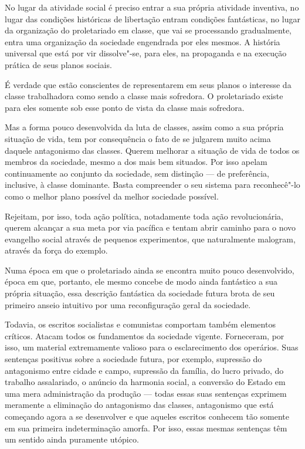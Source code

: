 No lugar da atividade social é preciso entrar a sua própria atividade
inventiva, no lugar das condições históricas de libertação entram
condições fantásticas, no lugar da organização do proletariado em
classe, que vai se processando gradualmente, entra uma organização da
sociedade engendrada por eles mesmos. A história universal que está por
vir dissolve"-se, para eles, na propaganda e na execução prática de seus
planos sociais.

É verdade que estão conscientes de representarem em seus planos o
interesse da classe trabalhadora como sendo a classe mais sofredora. O
proletariado existe para eles somente sob esse ponto de vista da classe
mais sofredora.

Mas a forma pouco desenvolvida da luta de classes, assim como a sua
própria situação de vida, tem por consequência o fato de se julgarem
muito acima daquele antagonismo das classes. Querem melhorar a situação
de vida de todos os membros da sociedade, mesmo a dos mais bem
situados. Por isso apelam continuamente ao conjunto da sociedade, sem
distinção  ---  de preferência, inclusive, à classe dominante. Basta
compreender o seu sistema para reconhecê"-lo como o melhor plano
possível da melhor sociedade possível.

Rejeitam, por isso, toda ação política, notadamente toda ação
revolucionária, querem alcançar a sua meta por via pacífica e tentam
abrir caminho para o novo evangelho social através de pequenos
experimentos, que naturalmente malogram, através da força do exemplo.

Numa época em que o proletariado ainda se encontra muito pouco
desenvolvido, época em que, portanto, ele mesmo concebe de modo ainda
fantástico a sua própria situação, essa descrição fantástica da
sociedade futura brota de seu primeiro anseio intuitivo por uma
reconfiguração geral da sociedade.

Todavia, os escritos socialistas e comunistas comportam também elementos
críticos. Atacam todos os fundamentos da sociedade vigente. Forneceram,
por isso, um material extremamente valioso para o esclarecimento dos
operários. Suas sentenças positivas sobre a sociedade futura, por
exemplo, supressão do antagonismo entre cidade e campo, supressão da
família, do lucro privado, do trabalho assalariado, o anúncio da
harmonia social, a conversão do Estado em uma mera administração da
produção  ---  todas essas suas sentenças exprimem meramente a eliminação
do antagonismo das classes, antagonismo que está começando agora a se
desenvolver e que aqueles escritos conhecem tão somente em sua primeira
indeterminação amorfa. Por isso, essas mesmas sentenças têm um sentido
ainda puramente utópico.

